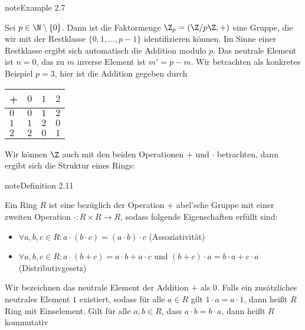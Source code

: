 \documentclass[letterpaper,10pt,english]{jupyterBook}
\begin{document}
\begin{sphinxadmonition}{note}{Example 2.7}



Sei \(p \in \N \setminus \{0\}\). Dann ist die Faktormenge \(\Z_p = (\Z/p\Z, +)\) eine Gruppe, die wir mit der Restklasse
\( \{0,1,\ldots,p-1\}\) identifizieren können. Im Sinne einer Restklasse ergibt sich automatisch die Addition modulo \(p\). Das neutrale Element ist \(n=0\), das zu \(m\) inverse Element ist \(m'=p-m\). Wir betrachten als konkretes Beispiel \(p=3\), hier ist die Addition gegeben durch


\begin{savenotes}\sphinxattablestart
\centering
\begin{tabulary}{\linewidth}[t]{|T|T|T|T|}
\hline
\sphinxstyletheadfamily 
+
&\sphinxstyletheadfamily 
\(0\)
&\sphinxstyletheadfamily 
\(1\)
&\sphinxstyletheadfamily 
\(2\)
\\
\hline
\(0\)
&
\(0\)
&
\(1\)
&
\(2\)
\\
\hline
\(1\)
&
\(1\)
&
\(2\)
&
\(0\)
\\
\hline
\(2\)
&
\(2\)
&
\(0\)
&
\(1\)
\\
\hline
\end{tabulary}
\par
\sphinxattableend\end{savenotes}
\end{sphinxadmonition}

Wir können \(\Z\) auch mit den beiden Operationen \(+\) und \(\cdot\) betrachten, dann ergibt sich die Struktur eines Rings:
\label{grundlagen/zahlensysteme:definition-6}
\begin{sphinxadmonition}{note}{Definition 2.11}



Ein Ring \(R\) ist eine bezüglich der Operation \(+\) abel’sche Gruppe mit einer zweiten Operation \(\cdot : R \times R \rightarrow R\), sodass folgende Eigenschaften erfüllt sind:
\begin{itemize}
\item {} 
\( \forall a,b,c \in R: a \cdot (b \cdot c) = (a\cdot b) \cdot c\) (Assoziativität)

\item {} 
\( \forall a,b,c \in R: a \cdot (b+c) = a\cdot b + a \cdot c\) und \((b+c) \cdot a = b \cdot a + c \cdot a\) (Distributivgesetz)

\end{itemize}

Wir bezeichnen das neutrale Element der Addition \(+\) als 0.
Falls ein zusätzliches neutrales Element \(1\) existiert, sodass für alle \(a  \in R\) gilt \(1 \cdot a = a \cdot 1\), dann
heißt \(R\) Ring mit Einselement. Gilt für alle \(a, b  \in R\), dass \(a \cdot b = b \cdot a\), dann heißt \(R\) kommutativ
\end{sphinxadmonition}
\end{document}
